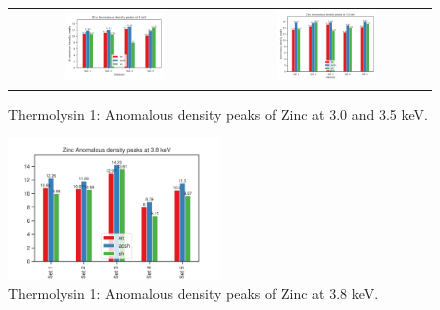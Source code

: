 \begin{figure}
    \centering
    \begin{tabular}{cc}
        \includegraphics[width = 0.5\textwidth]{plots/exp1/tlys_2_P6122/peaks/3p0_zn_2Dbar.png} & \includegraphics[width = 0.5\textwidth]{plots/exp1/tlys_2_P6122/peaks/3p5_zn_2Dbar.png}
    \end{tabular}
    \caption{Thermolysin 1: Anomalous density peaks of Zinc at 3.0 and 3.5 \unit{keV}.}
    \label{fig:tlys9_zn_peaks_3p0_3p5}
\end{figure}

\begin{figure}
    \centering
    \includegraphics[width = 0.5\textwidth]{plots/exp1/tlys_9_P6122/peaks/3p8_zn405_peaks.png}
    \caption{Thermolysin 1: Anomalous density peaks of Zinc at 3.8 \unit{keV}.}
    \label{fig:tlys9_zn_peaks_3p8}
\end{figure}



